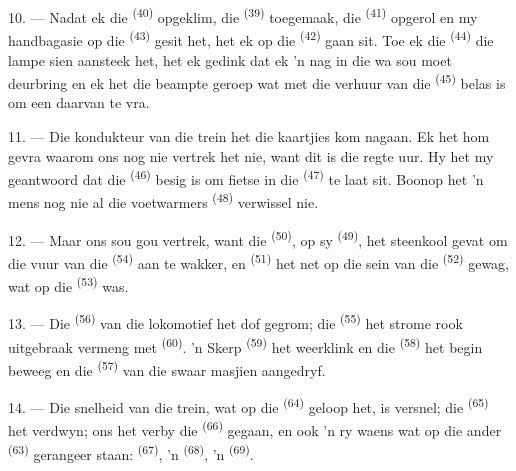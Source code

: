 \VUsaut{3.0mm}

10. --- Nadat ek die  \textsuperscript{(40)} opgeklim, die
 \textsuperscript{(39)} toegemaak, die 
\textsuperscript{(41)} opgerol en my handbagasie op die 
\textsuperscript{(43)} gesit het, het ek op die  \textsuperscript{(42)}
gaan sit. Toe ek die  \textsuperscript{(44)} die lampe sien aansteek
het, het ek gedink dat ek 'n nag in die wa sou moet deurbring en ek het die beampte
geroep wat met die verhuur van die  \textsuperscript{(45)} belas is
om een daarvan te vra.

11. --- Die kondukteur van die trein het die kaartjies kom nagaan. Ek het hom gevra
waarom ons nog nie vertrek het nie, want dit is die regte uur. Hy het my geantwoord dat
die  \textsuperscript{(46)} besig is om fietse in die
 \textsuperscript{(47)} te laat sit. Boonop het 'n mens nog nie al die
voetwarmers \textsuperscript{(48)} verwissel nie.

12. --- Maar ons sou gou vertrek, want die  \textsuperscript{(50)}, op sy
 \textsuperscript{(49)}, het steenkool gevat om die vuur van die
 \textsuperscript{(54)} aan te wakker, en 
\textsuperscript{(51)} het net op die sein van die 
\textsuperscript{(52)} gewag, wat op die  \textsuperscript{(53)} was.

13. --- Die  \textsuperscript{(56)} van die lokomotief het dof gegrom; die
 \textsuperscript{(55)} het strome rook uitgebraak vermeng met
 \textsuperscript{(60)}. 'n Skerp  \textsuperscript{(59)} het
weerklink en die  \textsuperscript{(58)} het begin beweeg en die
 \textsuperscript{(57)} van die swaar masjien aangedryf.

\VUsaut{3.0mm}
\VUsaut{3.0mm}

14. --- Die snelheid van die trein, wat op die  \textsuperscript{(64)}
geloop het, is versnel; die  \textsuperscript{(65)} het verdwyn; ons het
verby die  \textsuperscript{(66)} gegaan, en ook 'n ry waens wat op
die ander  \textsuperscript{(63)} gerangeer staan: 
\textsuperscript{(67)}, 'n  \textsuperscript{(68)}, 'n 
\textsuperscript{(69)}.

